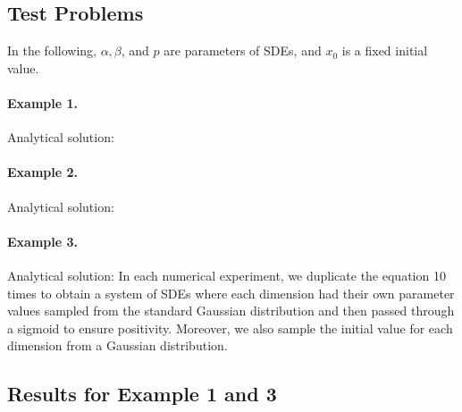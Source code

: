 \documentclass[twoside]{article}
\begin{document}
 \subsection{Test Problems}\label{app:test_problems}
In the following, $\alpha, \beta$, and $p$ are parameters of SDEs, and $x_0$ is a fixed initial value.

\paragraph{Example 1.}
Analytical solution:

\paragraph{Example 2.}
Analytical solution:

\paragraph{Example 3.}
Analytical solution:
In each numerical experiment, we duplicate the equation 10 times to obtain a system of SDEs where each dimension had their own parameter values sampled from the standard Gaussian distribution and then passed through a sigmoid to ensure positivity. Moreover, we also sample the initial value for each dimension from a Gaussian distribution.  \subsection{Results for Example 1 and 3}\label{app:test_problem_results}
\end{document}
